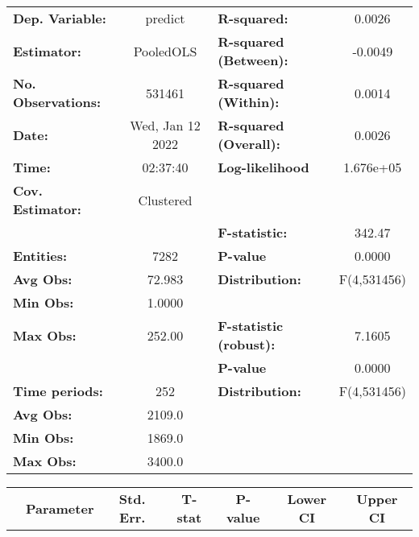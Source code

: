 \begin{center}
\begin{tabular}{lclc}
\toprule
\textbf{Dep. Variable:}    &      predict       & \textbf{  R-squared:         }   &      0.0026      \\
\textbf{Estimator:}        &     PooledOLS      & \textbf{  R-squared (Between):}  &     -0.0049      \\
\textbf{No. Observations:} &       531461       & \textbf{  R-squared (Within):}   &      0.0014      \\
\textbf{Date:}             &  Wed, Jan 12 2022  & \textbf{  R-squared (Overall):}  &      0.0026      \\
\textbf{Time:}             &      02:37:40      & \textbf{  Log-likelihood     }   &    1.676e+05     \\
\textbf{Cov. Estimator:}   &     Clustered      & \textbf{                     }   &                  \\
\textbf{}                  &                    & \textbf{  F-statistic:       }   &      342.47      \\
\textbf{Entities:}         &        7282        & \textbf{  P-value            }   &      0.0000      \\
\textbf{Avg Obs:}          &       72.983       & \textbf{  Distribution:      }   &   F(4,531456)    \\
\textbf{Min Obs:}          &       1.0000       & \textbf{                     }   &                  \\
\textbf{Max Obs:}          &       252.00       & \textbf{  F-statistic (robust):} &      7.1605      \\
\textbf{}                  &                    & \textbf{  P-value            }   &      0.0000      \\
\textbf{Time periods:}     &        252         & \textbf{  Distribution:      }   &   F(4,531456)    \\
\textbf{Avg Obs:}          &       2109.0       & \textbf{                     }   &                  \\
\textbf{Min Obs:}          &       1869.0       & \textbf{                     }   &                  \\
\textbf{Max Obs:}          &       3400.0       & \textbf{                     }   &                  \\
\bottomrule
\end{tabular}
\begin{tabular}{lcccccc}
                & \textbf{Parameter} & \textbf{Std. Err.} & \textbf{T-stat} & \textbf{P-value} & \textbf{Lower CI} & \textbf{Upper CI}  \\

\end{tabular}
\end{center}
